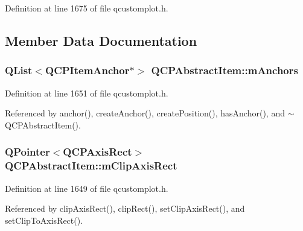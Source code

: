 Definition at line 1675 of file qcustomplot.\+h.



\subsection{Member Data Documentation}
\hypertarget{class_q_c_p_abstract_item_a909a3abab783de302ebf0a0e6f2bbc15}{}
\subsubsection[{m\+Anchors}]{\setlength{\rightskip}{0pt plus 5cm}Q\+List$<${\bf Q\+C\+P\+Item\+Anchor}$\ast$$>$ Q\+C\+P\+Abstract\+Item\+::m\+Anchors\hspace{0.3cm}{\ttfamily [protected]}}\label{class_q_c_p_abstract_item_a909a3abab783de302ebf0a0e6f2bbc15}


Definition at line 1651 of file qcustomplot.\+h.



Referenced by anchor(), create\+Anchor(), create\+Position(), has\+Anchor(), and $\sim$\+Q\+C\+P\+Abstract\+Item().

\hypertarget{class_q_c_p_abstract_item_a3e57cfe7da4b1ac3d6fa7281ea437361}{}
\subsubsection[{m\+Clip\+Axis\+Rect}]{\setlength{\rightskip}{0pt plus 5cm}Q\+Pointer$<${\bf Q\+C\+P\+Axis\+Rect}$>$ Q\+C\+P\+Abstract\+Item\+::m\+Clip\+Axis\+Rect\hspace{0.3cm}{\ttfamily [protected]}}\label{class_q_c_p_abstract_item_a3e57cfe7da4b1ac3d6fa7281ea437361}


Definition at line 1649 of file qcustomplot.\+h.



Referenced by clip\+Axis\+Rect(), clip\+Rect(), set\+Clip\+Axis\+Rect(), and set\+Clip\+To\+Axis\+Rect().

\hypertarget{class_q_c_p_abstract_item_ad2a70ff6b658fcb84a9427f69d3f587d}{}
